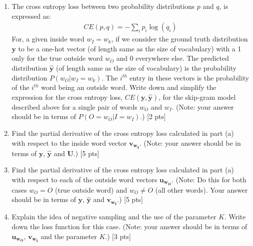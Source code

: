 \begin{enumerate}
    \item The cross entropy loss between two probability distributions $p$ and $q$, is expressed as:
        \begin{align}
            CE(p, q) = - \sum_i p_i \log(q_i)
        \end{align}
        For, a given inside word $w_I = w_k$, if we consider the ground truth distribution $\bm{y}$ to be a one-hot vector (of length same as the size of vocabulary) with a 1 only for the true outside word $w_O$ and 0 everywhere else. The predicted distribution $\hat{\bm{y}}$ (of length same as the size of vocabulary) is the probability distribution $P(w_O | w_I = w_k)$. The $i^{th}$ entry in these vectors is the probability of the $i^{th}$ word being an outside word. Write down and simplify the expression for the cross entropy loss, $CE(\bm{y}, \hat{\bm{y}})$, for the skip-gram model described above for a single pair of words $w_O$ and $w_I$. (Note: your answer should be in terms of $P(O = w_O | I = w_I)$.) [2 pts]
    \item Find the partial derivative of the cross entropy loss calculated in part (a) with respect to the inside word vector $\bm{v_{w_I}}$. (Note: your answer should be in terms of $\bm{y}$, $\hat{\bm{y}}$ and $\textbf{U}$.) [5 pts]
    \item Find the partial derivative of the cross entropy loss calculated in part (a) with respect to each of the outside word vectors $\bm{u_{w_O}}$. (Note: Do this for both cases $w_O = O$ (true outside word) and $w_O \neq O$ (all other words). Your answer should be in terms of $\bm{y}$, $\hat{\bm{y}}$ and $\bm{v_{w_I}}$.) [5 pts]
    \item Explain the idea of negative sampling and the use of the parameter $K$. Write down the loss function for this case. (Note: your answer should be in terms of $\bm{u_{w_O}}$, $\bm{v_{w_I}}$ and the parameter $K$.) [3 pts]
\end{enumerate}


